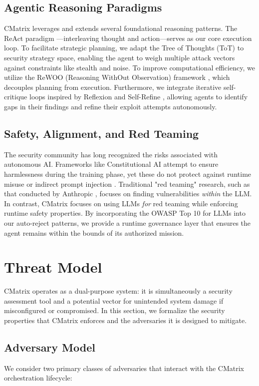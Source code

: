 \documentclass[conference,compsoc]{IEEEtran}
\begin{document}
\subsection{Agentic Reasoning Paradigms}
CMatrix leverages and extends several foundational reasoning patterns. The ReAct paradigm \cite{react}---interleaving thought and action---serves as our core execution loop. To facilitate strategic planning, we adapt the Tree of Thoughts (ToT) \cite{tot} to security strategy space, enabling the agent to weigh multiple attack vectors against constraints like stealth and noise. To improve computational efficiency, we utilize the ReWOO (Reasoning WithOut Observation) framework \cite{rewoo}, which decouples planning from execution. Furthermore, we integrate iterative self-critique loops inspired by Reflexion \cite{reflexion} and Self-Refine \cite{selfrefine}, allowing agents to identify gaps in their findings and refine their exploit attempts autonomously.

\subsection{Safety, Alignment, and Red Teaming}
The security community has long recognized the risks associated with autonomous AI. Frameworks like Constitutional AI \cite{constitutionalai} attempt to ensure harmlessness during the training phase, yet these do not protect against runtime misuse or indirect prompt injection \cite{greshake}. Traditional "red teaming" research, such as that conducted by Anthropic \cite{ganguli2022red, perez2022red}, focuses on finding vulnerabilities \textit{within} the LLM. In contrast, CMatrix focuses on using LLMs \textit{for} red teaming while enforcing runtime safety properties. By incorporating the OWASP Top 10 for LLMs \cite{owaspllm} into our auto-reject patterns, we provide a runtime governance layer that ensures the agent remains within the bounds of its authorized mission.

\section{Threat Model}
CMatrix operates as a dual-purpose system: it is simultaneously a security assessment tool and a potential vector for unintended system damage if misconfigured or compromised. In this section, we formalize the security properties that CMatrix enforces and the adversaries it is designed to mitigate.

\subsection{Adversary Model}
We consider two primary classes of adversaries that interact with the CMatrix orchestration lifecycle:
\end{document}
